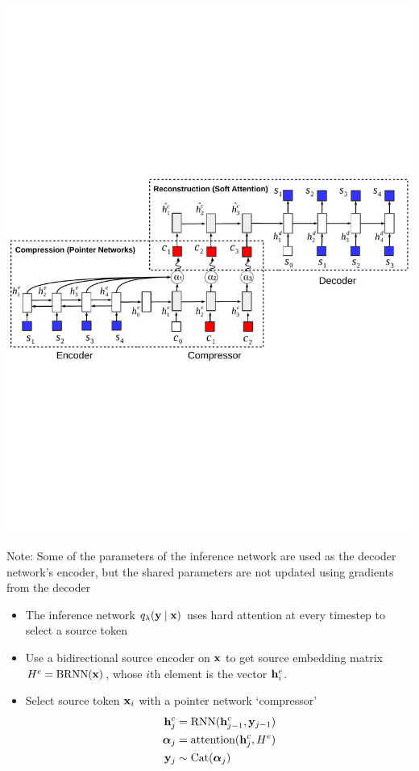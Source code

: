 \begin{frame}
\begin{center}
\end{center}
\center
\includegraphics[scale=0.5]{img/aec.pdf}

Note: Some of the parameters of the inference network
are used as the decoder network's encoder, but the shared parameters are not updated
using gradients from the decoder
\end{frame}

\begin{frame}
\begin{center}
\end{center}
\begin{itemize}
\item The inference network $q_\lambda(\mathbf{y}\mid\mathbf{x})$
uses hard attention at every timestep to select a source token
\item Use a bidirectional source encoder on $\mathbf{x}$ to get source embedding matrix
$H^e = \textrm{BRNN}(\mathbf{x})$, whose $i$th element is the vector $\mathbf{h}_i^e$.
\item Select source token $\mathbf{x}_i$ with a pointer network `compressor'
\begin{align}
\mathbf{h}_j^c &= \textrm{RNN}(\mathbf{h}_{j-1}^c, \mathbf{y}_{j-1})\\
\bm{\alpha}_j &= \textrm{attention}(\mathbf{h}_j^c, H^e)\\
\mathbf{y}_j &\sim \textrm{Cat}(\bm{\alpha}_j)
\end{align}
\end{itemize}
\end{frame}

